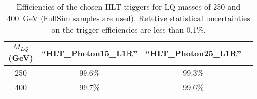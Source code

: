 \begin{table}[htbp]
\begin{center}
\begin{tabular}{|c|c|c|c|}
\hline\hline
$M_{LQ}$ (GeV)     & ``HLT\_Photon15\_L1R''  &  ``HLT\_Photon25\_L1R'' \\
\hline\hline
250                & 99.6\%   & 99.3\%  \\
400                & 99.7\%   & 99.6\%  \\
\hline\hline
\end{tabular}
\end{center}
\caption{Efficiencies of the chosen HLT triggers for LQ masses of 250 and 400~GeV (FullSim samples are used). 
Relative statistical uncertainties on the trigger efficiencies are less than 0.1\%.}
\label{tab:HLTEffic}
\end{table}






%

